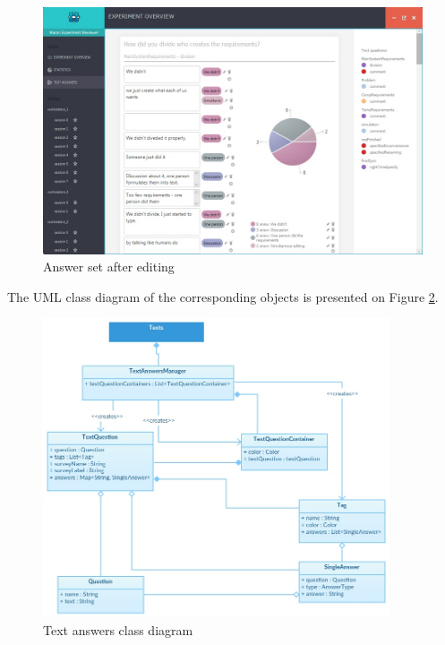    \begin{figure}[htb]
 \centering
\includegraphics[width=370pt]{figures/texts_2.jpg}
\caption{Answer set after editing}
\label{fig:texts_2}
 \end{figure} 


The UML class diagram of the corresponding objects is presented on Figure \ref{fig:texts_class_diagram}.\\
 
    \begin{figure}[htb]
 \centering
\includegraphics[width=290pt]{figures/texts_class_diagram.jpg}
\caption{Text answers class diagram}
\label{fig:texts_class_diagram}
 \end{figure}


